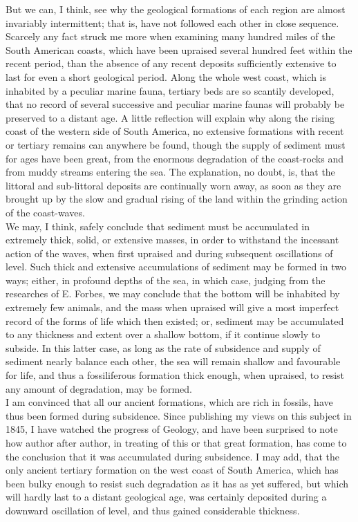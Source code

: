 \indent But we can, I think, see why the geological formations of each region are almost invariably intermittent; that is, have not followed each other in close sequence. Scarcely any fact struck me more when examining many hundred miles of the South American coasts, which have been upraised several hundred feet within the recent period, than the absence of any recent deposits sufficiently extensive to last for even a short geological period. Along the whole west coast, which is inhabited by a peculiar marine fauna, tertiary beds are so scantily developed, that no record of several successive and peculiar marine faunas will probably be preserved to a distant age. A little reflection will explain why along the rising coast of the western side of South America, no extensive formations with recent or tertiary remains can anywhere be found, though the supply of sediment must for ages have been great, from the enormous degradation of the coast-rocks and from muddy streams entering the sea. The explanation, no doubt, is, that the littoral and sub-littoral deposits are continually worn away, as soon as they are brought up by the slow and gradual rising of the land within the grinding action of the coast-waves.\\
\indent We may, I think, safely conclude that sediment must be accumulated in extremely thick, solid, or extensive masses, in order to withstand the incessant action of the waves, when first upraised and during subsequent oscillations of level. Such thick and extensive accumulations of sediment may be formed in two ways; either, in profound depths of the sea, in which case, judging from the researches of E. Forbes, we may conclude that the bottom will be inhabited by extremely few animals, and the mass when upraised will give a most imperfect record of the forms of life which then existed; or, sediment may be accumulated to any thickness and extent over a shallow bottom, if it continue slowly to subside. In this latter case, as long as the rate of subsidence and supply of sediment nearly balance each other, the sea will remain shallow and favourable for life, and thus a fossiliferous formation thick enough, when upraised, to resist any amount of degradation, may be formed.\\
\indent I am convinced that all our ancient formations, which are rich in fossils, have thus been formed during subsidence.  Since publishing my views on this subject in 1845, I have watched the progress of Geology, and have been surprised to note how author after author, in treating of this or that great formation, has come to the conclusion that it was accumulated during subsidence. I may add, that the only ancient tertiary formation on the west coast of South America, which has been bulky enough to resist such degradation as it has as yet suffered, but which will hardly last to a distant geological age, was certainly deposited during a downward oscillation of level, and thus gained considerable thickness.\\
